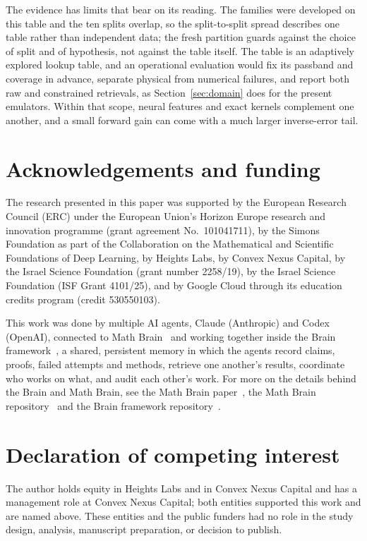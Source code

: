 \documentclass[11pt]{article}
\newcommand{\1}{\mathbf{1}}
\begin{document}
The evidence has limits that bear on its reading. The families were developed on this table and
the ten splits overlap, so the split-to-split spread describes one table rather than independent
data; the fresh partition guards against the choice of split and of hypothesis, not against the
table itself. The table is an adaptively explored lookup table, and an operational evaluation
would fix its passband and coverage in advance, separate physical from numerical failures, and
report both raw and constrained retrievals, as Section~\ref{sec:domain} does for the present
emulators. Within that scope, neural features and exact kernels complement one another, and a
small forward gain can come with a much larger inverse-error tail.

\clearpage
\section*{Acknowledgements and funding}

The research presented in this paper was supported by the European Research Council (ERC) under
the European Union's Horizon Europe research and innovation programme (grant agreement
No.~101041711), by the Simons Foundation as part of the Collaboration on the Mathematical and
Scientific Foundations of Deep Learning, by Heights Labs, by Convex Nexus Capital, by the Israel
Science Foundation (grant number 2258/19), by the Israel Science Foundation (ISF Grant
4101/25), and by Google Cloud through its education credits program (credit 530550103).

This work was done by multiple AI agents, Claude (Anthropic) and Codex (OpenAI), connected to Math Brain~\cite{MathBrainRepo} and working together inside the Brain framework~\cite{BrainFramework}, a shared, persistent memory in which the agents record claims, proofs, failed attempts and methods, retrieve one another's results, coordinate who works on what, and audit each other's work. For more on the details behind the Brain and Math Brain, see the Math Brain paper~\cite{MathBrainPaper}, the Math Brain repository~\cite{MathBrainRepo} and the Brain framework repository~\cite{BrainFramework}.

\section*{Declaration of competing interest}

The author holds equity in Heights Labs and in Convex Nexus Capital and has a management role at
Convex Nexus Capital; both entities supported this work and are named above. These entities and
the public funders had no role in the study design, analysis, manuscript preparation, or
decision to publish.
\end{document}

